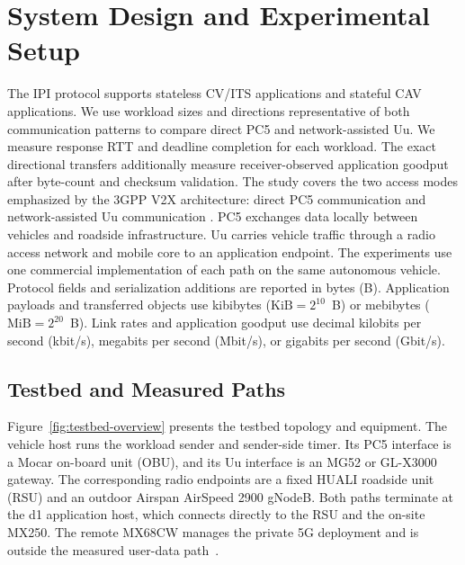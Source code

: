 \section{System Design and Experimental Setup}
\label{sec:system-design}
\label{sec:setup}

The IPI protocol supports stateless CV/ITS applications and stateful CAV
applications. We use workload sizes and directions representative of both
communication patterns to compare direct PC5 and network-assisted Uu. We
measure response RTT and deadline completion for each workload. The
exact directional transfers additionally measure receiver-observed application
goodput after byte-count and checksum validation. The
study covers the two access modes emphasized by the 3GPP V2X architecture:
direct PC5 communication and network-assisted Uu communication
\cite{etsi123287r18}. PC5 exchanges data locally between vehicles and roadside
infrastructure. Uu carries vehicle traffic through a radio access network and
mobile core to an application endpoint. The experiments use one
commercial implementation of each path on the same autonomous vehicle.
Protocol fields and serialization additions are reported in bytes (B).
Application payloads and transferred objects use kibibytes
($\mathrm{KiB}=2^{10}$~B) or mebibytes ($\mathrm{MiB}=2^{20}$~B). Link rates
and application goodput use decimal kilobits per second (kbit/s), megabits per
second (Mbit/s), or gigabits per second (Gbit/s).

\subsection{Testbed and Measured Paths}

Figure~\ref{fig:testbed-overview} presents the testbed topology and equipment.
The vehicle host runs the workload sender and sender-side timer. Its
PC5 interface is a Mocar on-board unit (OBU), and its Uu interface is an MG52 or
GL-X3000 gateway. The corresponding radio endpoints are a fixed HUALI roadside
unit (RSU) and an outdoor Airspan AirSpeed 2900 gNodeB. Both paths terminate at
the d1 application host, which connects directly to the RSU and the on-site
MX250. The remote MX68CW manages the private 5G deployment and is outside the
measured user-data path~\cite{cisco2025private5g,cisco2026mx250,cisco2026mx68}.

